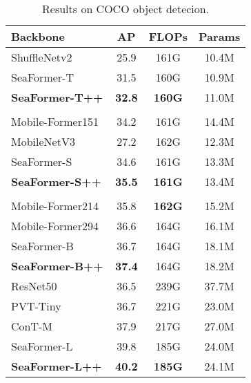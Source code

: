 \begin{table}[tb]
    \centering
    \small
    \begin{tabular}[b]{l | c |c |c }
    \hline

    \hline

    \hline
        Backbone & AP  & FLOPs    & Params\\

    \hline
        
    \hline
    \hline
    ShuffleNetv2~\cite{ma2018shufflenet} & 25.9  & 161G  & 10.4M   \\
    SeaFormer-T &  31.5        & 160G    & 10.9M        \\
    \textbf{SeaFormer-T++} &  \textbf{32.8}         & \textbf{160G}    & 11.0M        \\      \\
    \hline
          
    \hline
    \hline
    Mobile-Former151~\cite{chen2022mobile}   & 34.2   & 161G   & 14.4M\\
    MobileNetV3~\cite{howard2019searching} & 27.2  &162G   & 12.3M \\

    SeaFormer-S &  34.6           & 161G   & 13.3M         \\
    \textbf{SeaFormer-S++} &  \textbf{35.5}           & \textbf{161G}   & 13.4M         \\       \\
    \hline
        
    \hline
    \hline
    Mobile-Former214~\cite{chen2022mobile}     & 35.8  &\textbf{162G}    & 15.2M\\
    Mobile-Former294~\cite{chen2022mobile}     & 36.6   &164G   & 16.1M\\
    SeaFormer-B &  36.7      & 164G   &18.1M            \\
    \textbf{SeaFormer-B++} &  \textbf{37.4}      & 164G   &18.2M            \\
    \hline

    \hline
    \hline
    ResNet50~\cite{he2016deep} & 36.5  & 239G & 37.7M \\
    PVT-Tiny~\cite{wang2021pyramid} & 36.7  & 221G  & 23.0M  \\
    ConT-M~\cite{yan2021contnet} & 37.9  & 217G  & 27.0M   \\
    SeaFormer-L &  39.8      & 185G  &24.0M            \\
    \textbf{SeaFormer-L++} &  \textbf{40.2}       & \textbf{185G}    &24.1M            \\
         \hline

        \hline
        
        \hline
  \end{tabular}
\caption{Results on COCO object detecion.}
\label{table_coco_obj}
\end{table}